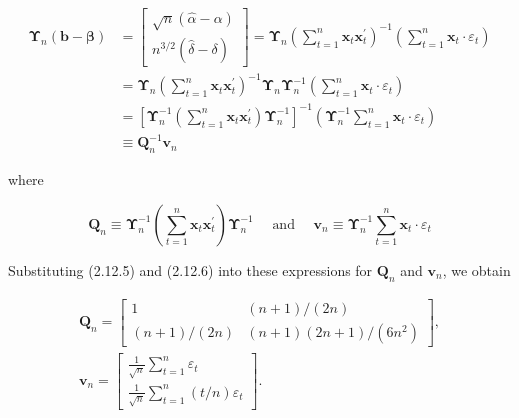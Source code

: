 \documentclass[10pt]{article}
\begin{document}
\begin{align*}
\boldsymbol{\Upsilon}_{n}(\mathbf{b}-\boldsymbol{\beta}) & =\left[\begin{array}{c}
\sqrt{n}(\hat{\alpha}-\alpha) \\
n^{3 / 2}(\hat{\delta}-\delta)
\end{array}\right]=\boldsymbol{\Upsilon}_{n}\left(\sum_{t=1}^{n} \mathbf{x}_{t} \mathbf{x}_{t}^{\prime}\right)^{-1}\left(\sum_{t=1}^{n} \mathbf{x}_{t} \cdot \varepsilon_{t}\right) \\
& =\boldsymbol{\Upsilon}_{n}\left(\sum_{t=1}^{n} \mathbf{x}_{t} \mathbf{x}_{t}^{\prime}\right)^{-1} \boldsymbol{\Upsilon}_{n} \boldsymbol{\Upsilon}_{n}^{-1}\left(\sum_{t=1}^{n} \mathbf{x}_{t} \cdot \varepsilon_{t}\right) \\
& =\left[\boldsymbol{\Upsilon}_{n}^{-1}\left(\sum_{t=1}^{n} \mathbf{x}_{t} \mathbf{x}_{t}^{\prime}\right) \boldsymbol{\Upsilon}_{n}^{-1}\right]^{-1}\left(\boldsymbol{\Upsilon}_{n}^{-1} \sum_{t=1}^{n} \mathbf{x}_{t} \cdot \varepsilon_{t}\right) \\
& \equiv \mathbf{Q}_{n}^{-1} \mathbf{v}_{n} \tag{2.12.7}
\end{align*}


where


\begin{equation*}
\mathbf{Q}_{n} \equiv \mathbf{\Upsilon}_{n}^{-1}\left(\sum_{t=1}^{n} \mathbf{x}_{t} \mathbf{x}_{t}^{\prime}\right) \mathbf{\Upsilon}_{n}^{-1} \quad \text { and } \quad \mathbf{v}_{n} \equiv \mathbf{\Upsilon}_{n}^{-1} \sum_{t=1}^{n} \mathbf{x}_{t} \cdot \varepsilon_{t} \tag{2.12.8}
\end{equation*}


Substituting (2.12.5) and (2.12.6) into these expressions for $\mathbf{Q}_{n}$ and $\mathbf{v}_{n}$, we obtain


\begin{gather*}
\mathbf{Q}_{n}=\left[\begin{array}{cc}
1 & (n+1) /(2 n) \\
(n+1) /(2 n) & (n+1)(2 n+1) /\left(6 n^{2}\right)
\end{array}\right], \\
\mathbf{v}_{n}=\left[\begin{array}{c}
\frac{1}{\sqrt{n}} \sum_{t=1}^{n} \varepsilon_{t} \\
\frac{1}{\sqrt{n}} \sum_{t=1}^{n}(t / n) \varepsilon_{t}
\end{array}\right] . \tag{2.12.9}
\end{gather*}
\end{document}
